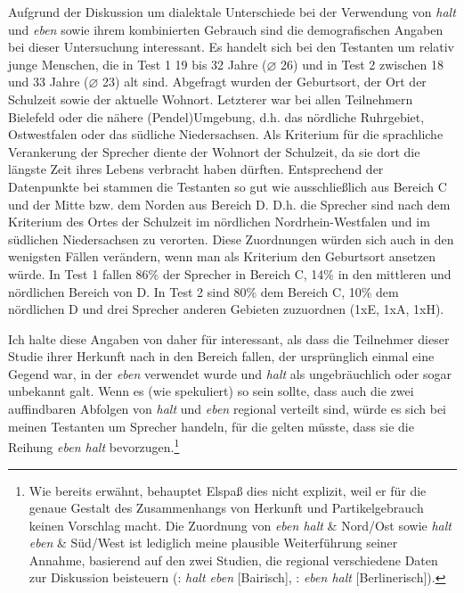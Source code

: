 Aufgrund der Diskussion um dialektale Unterschiede bei der Verwendung von \textit{halt} und \textit{eben} sowie ihrem kombinierten Gebrauch sind die demografischen Angaben bei dieser Untersuchung interessant. Es handelt sich bei den Testanten um relativ junge Menschen, die in Test 1 19 bis 32 Jahre (⌀ 26) und in Test 2 zwischen 18 und 33 Jahre (⌀ 23) alt sind. Abgefragt wurden der Geburts\-ort, der Ort der Schulzeit sowie der aktuelle Wohnort. Letzterer war bei allen Teilnehmern Bielefeld oder die nähere (Pendel)Umgebung, d.h. das nördliche Ruhrgebiet, Ost\-westfalen oder das südliche Niedersachsen. Als Kriterium für die sprachliche Verankerung der Sprecher diente der Wohnort der Schulzeit, da sie dort die längste Zeit ihres Lebens verbracht haben dürften. Entsprechend der Datenpunkte bei \citet{Eichhoff1978} stammen die Testanten so gut wie ausschließlich aus Be\-reich C und der Mitte bzw. dem Norden aus Bereich D. D.h. die Sprecher sind nach dem Kriterium des Ortes der Schulzeit im nördlichen Nordrhein-Westfalen und im südlichen Niedersachsen zu verorten. Diese Zuordnungen würden sich auch in den wenigsten Fällen verändern, wenn man als Kriterium den Geburts\-ort ansetzen würde. In Test 1 fallen 86\% der Sprecher in Bereich C, 14\% in den mittleren und nördlichen Bereich von D. In Test 2 sind 80\% dem Bereich C, 10\% dem nördlichen D und drei Sprecher anderen Gebieten zuzuordnen (1xE, 1xA, 1xH).

Ich halte diese Angaben von daher für interessant, als dass die Teilnehmer dieser Studie ihrer Herkunft nach in den Bereich fallen, der ursprünglich einmal eine Gegend war, in der \textit{eben} verwendet wurde und \textit{halt} als ungebräuchlich oder sogar unbekannt galt. Wenn es (wie \citealt[17, Fn 41]{Elspass2005} spekuliert) so sein sollte, dass auch die zwei auffindbaren Abfolgen von \textit{halt} und \textit{eben} regional verteilt sind, würde es sich bei meinen Testanten um Sprecher handeln, für die gelten müsste, dass sie die Reihung \textit{eben halt} bevorzugen.\footnote{Wie bereits erwähnt, behauptet Elspaß dies nicht explizit, weil er für die genaue Gestalt des Zusammenhangs von Herkunft und Partikelgebrauch keinen Vorschlag macht. Die Zuordnung von \textit{eben halt} \& Nord/Ost sowie \textit{halt eben} \& Süd/West ist lediglich meine plausible Weiterführung seiner Annahme, basierend auf den zwei Studien, die regional verschiedene Daten zur Diskussion beisteuern (\citealt{Thurmair1989}: \textit{halt eben} [Bairisch], \citealt{Dittmar2000}: \textit{eben halt} [Berlinerisch]).}

